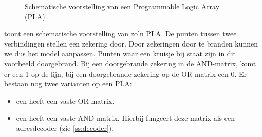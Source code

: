 \begin{figure}[hbt]
\caption{Schematische voorstelling van een Programmable Logic Array (PLA).}
\end{figure}
toont een schematische voorstelling van zo'n PLA. De punten tussen twee verbindingen stellen een zekering door. Door zekeringen door te branden kunnen we dus het model aanpassen. Punten waar een kruisje bij staat zijn in dit voorbeeld doorgebrand. Bij een doorgebrande zekering in de AND-matrix, komt er een 1 op de lijn, bij een doorgebrande zekering op de OR-matrix een 0. Er bestaan nog twee varianten op een PLA:
\begin{itemize}
 \item een  heeft een vaste OR-matrix.
 \item een  heeft een vaste AND-matrix. Hierbij fungeert deze matrix als een adresdecoder (zie \ref{ss:decoder}).
\end{itemize}
